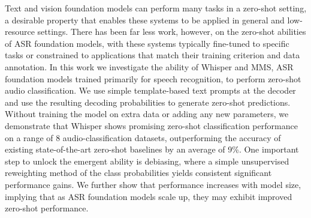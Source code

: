 Text and vision foundation models can perform many tasks in a zero-shot setting, a desirable property that enables these systems to be applied in general and low-resource settings. There has been far less work, however, on the zero-shot abilities of ASR foundation models, with these systems typically fine-tuned to specific tasks or constrained to applications that match their training criterion and data annotation. In this work we investigate the ability of Whisper and MMS, ASR foundation models trained primarily for speech recognition, to perform zero-shot audio classification. We use simple template-based text prompts at the decoder and use the resulting decoding probabilities to generate zero-shot predictions. Without training the model on extra data or adding any new parameters, we demonstrate that Whisper shows promising zero-shot classification performance on a range of 8 audio-classification datasets, outperforming the accuracy of existing state-of-the-art zero-shot baselines by an average of 9\%. One important step to unlock the emergent ability is debiasing, where a simple unsupervised reweighting method of the class probabilities yields consistent significant performance gains. We further show that performance increases with model size, implying that as ASR foundation models scale up, they may exhibit improved zero-shot performance.